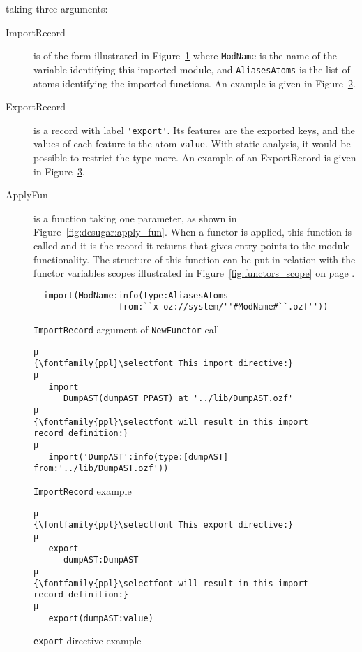 \documentclass[a4paper]{memoir}
\begin{document}
taking three arguments:
\begin{description}
  \item[ImportRecord] is of the form  illustrated in
    Figure~\ref{fig:desugar:import_record}
    where \lstinline!ModName! is the name
    of the variable identifying this imported module, and
    \lstinline!AliasesAtoms! is the list of atoms identifying the imported
    functions. An example is given in Figure~\ref{fig:desugar:import_record_example}.
  \item[ExportRecord] is a record with label \lstinline!'export'!. Its features are the
    exported keys, and the values of each feature is the atom \lstinline!value!.
     With static analysis, it would be possible to restrict the
    type more. An example of an ExportRecord is given in Figure~\ref{fig:desugar:export_record}.
  \item[ApplyFun] is a function taking one parameter, as shown in
    Figure~\ref{fig:desugar:apply_fun}. When a functor is applied, this function is called
    and it is the record it returns that gives entry points to the module
    functionality. The structure of this function can be put in relation with
    the functor variables scopes illustrated in Figure~\ref{fig:functors_scope}
    on page \pageref{fig:functors_scope}.
\end{description}

\begin{figure}[ht]
\begin{lstlisting}
  import(ModName:info(type:AliasesAtoms 
                 from:``x-oz://system/''#ModName#``.ozf'')) 
\end{lstlisting}
\caption{\lstinline!ImportRecord! argument of \lstinline!NewFunctor! call}
\label{fig:desugar:import_record}
\end{figure}


\begin{figure}[ht]
\begin{lstlisting}
µ
{\fontfamily{ppl}\selectfont This import directive:}
µ
   import
      DumpAST(dumpAST PPAST) at '../lib/DumpAST.ozf'
µ
{\fontfamily{ppl}\selectfont will result in this import record definition:}
µ
   import('DumpAST':info(type:[dumpAST] from:'../lib/DumpAST.ozf'))
\end{lstlisting}
\caption{\lstinline!ImportRecord! example}
\label{fig:desugar:import_record_example}
\end{figure}

\begin{figure}[h]
\begin{lstlisting}
µ
{\fontfamily{ppl}\selectfont This export directive:}
µ
   export
      dumpAST:DumpAST
µ
{\fontfamily{ppl}\selectfont will result in this import record definition:}
µ
   export(dumpAST:value)
\end{lstlisting}
\caption{\lstinline!export! directive example}
\label{fig:desugar:export_record}
\end{figure}
\end{document}
